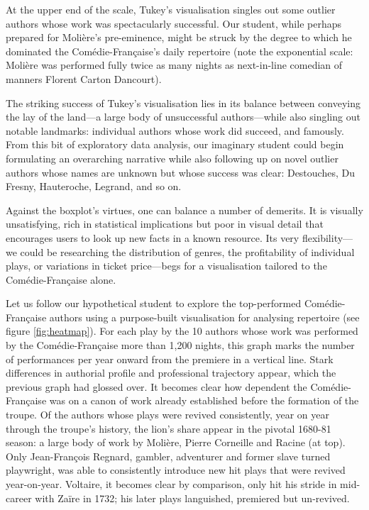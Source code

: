 \documentclass[	DIV=calc,%
							paper=a4,%
							fontsize=11pt,%
							twocolumn]{scrartcl}	 					%
\begin{document}
At the upper end of the scale, Tukey’s visualisation singles out some outlier authors whose work was spectacularly successful.  Our student, while perhaps prepared for Molière’s pre-eminence, might be struck by the degree to which he dominated the Comédie-Française’s daily repertoire (note the exponential scale: Molière was performed fully twice as many nights as next-in-line comedian of manners Florent Carton Dancourt).

The striking success of Tukey’s visualisation lies in its balance between conveying the lay of the land—a large body of unsuccessful authors—while also singling out notable landmarks: individual authors whose work did succeed, and famously.  From this bit of exploratory data analysis, our imaginary student could begin formulating an overarching narrative while also following up on novel outlier authors whose names are unknown but whose success was clear: Destouches, Du Fresny, Hauteroche, Legrand, and so on.

Against the boxplot’s virtues, one can balance a number of demerits.  It is visually unsatisfying, rich in statistical implications but poor in visual detail that encourages users to look up new facts in a known resource.  Its very flexibility—we could be researching the distribution of genres, the profitability of individual plays, or variations in ticket price—begs for a visualisation tailored to the Comédie-Française alone.

Let us follow our hypothetical student to explore the top-performed Comédie-Française authors using a purpose-built visualisation for analysing repertoire (see figure
\ref{fig:heatmap}).  For each play by the 10 authors whose work was performed by the Comédie-Française more than 1,200 nights, this graph marks the number of performances per year onward from the premiere in a vertical line.  Stark differences in authorial profile and professional trajectory appear, which the previous graph had glossed over.  It becomes clear how dependent the Comédie-Française was on a canon of work already established before the formation of the troupe.  Of the authors whose plays were revived consistently, year on year through the troupe’s history, the lion’s share appear in the pivotal 1680-81 season: a large body of work by Molière, Pierre Corneille and Racine (at top).  Only Jean-François Regnard, gambler, adventurer and former slave turned playwright, was able to consistently introduce new hit plays that were revived year-on-year.  Voltaire, it becomes clear by comparison, only hit his stride in mid-career with Zaïre in 1732; his later plays languished, premiered but un-revived.
\end{document}
